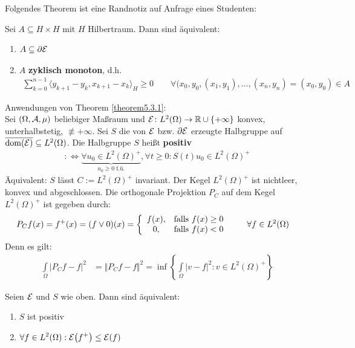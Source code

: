 Folgendes Theorem ist eine Randnotiz auf Anfrage eines Studenten:

\begin{theorem}
	Sei $A\subseteq H\times H$ mit $H$ Hilbertraum. Dann sind äquivalent:
	\begin{enumerate}[label=(\roman*)]
		\item $\begin{aligned}
			A\subseteq\partial\mathcal{E}
		\end{aligned}$
		\item $A$ \textbf{zyklisch monoton}, d.h.
		\begin{align*}
			\sum\limits_{k=0}^{n-1}\big\langle y_{k+1}-y_k,x_{k+1}-x_k\big\rangle_H\geq0
			\qquad\forall(x_0,y_0,(x_1,y_1),\ldots,(x_n,y_n)=(x_0,y_0)\in A
		\end{align*}
	\end{enumerate}
\end{theorem}

Anwendungen von Theorem \ref{theorem5.3.1}:\\
Sei $(\Omega,\mathcal{A},\mu)$ beliebiger Maßraum und $\mathcal{E}\colon L^2(\Omega)\to\mathbb{R}\cup\lbrace+\infty\rbrace$ konvex, unterhalbstetig, $\not\equiv+\infty$.
Sei $S$ die von $\mathcal{E}$ bzw. $\partial\mathcal{E}$ erzeugte Halbgruppe auf $\overline{\operatorname{dom}(\mathcal{E})}\subseteq L^2(\Omega)$.
Die Halbgruppe $S$ heißt \textbf{positiv}
\begin{align*}
	:\Longleftrightarrow\underbrace{\forall u_0\in L^2(\Omega)^+}_{u_0\geq0\text{ f.ü.}},\forall t\geq0: S(t)u_0\in L^2(\Omega)^+
\end{align*}
Äquivalent: $S$ lässt $C:=L^2(\Omega)^+$ invariant.
Der Kegel $L^2(\Omega)^+$ ist nichtleer, konvex und abgeschlossen.
Die orthogonale Projektion $P_C$ auf dem Kegel $L^2(\Omega)^+$ ist gegeben durch: 
\begin{align*}
	P_C f(x)
	&=f^+(x)
	=(f\vee 0)(x)
	=\left\lbrace\begin{array}{cl}
		f(x), &\text{falls } f(x)\geq0\\
		0 ,&\text{falls } f(x)<0
	\end{array}\right.
	\qquad\forall f\in L^2(\Omega)
\end{align*}
Denn es gilt:
\begin{align*}
	\int\limits_\Omega\big|P_C f-f\big|^2
	&=\big\Vert P_C f-f\big\Vert^2
	=\inf\limits\left\lbrace\int\limits_\Omega |v-f|^2:v\in L^2(\Omega)^+\right\rbrace
\end{align*}

\begin{korollar}
	Seien $\mathcal{E}$ und $S$ wie oben.
	Dann sind äquivalent:
	\begin{enumerate}[label=(\roman*)]
		\item $S$ ist positiv
		\item $\begin{aligned}
			\forall f\in L^2(\Omega):\mathcal{E}\big(f^+\big)\leq\mathcal{E}(f)
		\end{aligned}$
	\end{enumerate}
\end{korollar}

